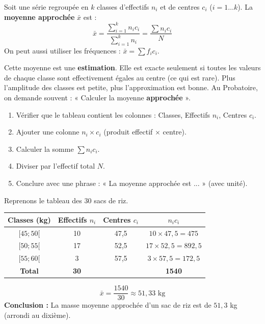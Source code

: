 \documentclass[11pt]{article}
\begin{document}
\begin{propriete}
Soit une série regroupée en $k$ classes d'effectifs $n_i$ et de centres $c_i$ ($i=1\dots k$). La \textbf{moyenne approchée} $\bar{x}$ est :
\[
\bar{x} = \frac{\sum_{i=1}^{k} n_i c_i}{\sum_{i=1}^{k} n_i} = \frac{\sum n_i c_i}{N}
\]
On peut aussi utiliser les fréquences : $\bar{x} = \sum f_i c_i$.
\end{propriete}

\begin{attention}
Cette moyenne est une \textbf{estimation}. Elle est exacte seulement si toutes les valeurs de chaque classe sont effectivement égales au centre (ce qui est rare). Plus l'amplitude des classes est petite, plus l'approximation est bonne. Au Probatoire, on demande souvent : « Calculer la moyenne \textbf{approchée} ».
\end{attention}

\begin{methode}
\begin{enumerate}
    \item Vérifier que le tableau contient les colonnes : Classes, Effectifs $n_i$, Centres $c_i$.
    \item Ajouter une colonne $n_i \times c_i$ (produit effectif $\times$ centre).
    \item Calculer la somme $\sum n_i c_i$.
    \item Diviser par l'effectif total $N$.
    \item Conclure avec une phrase : « La moyenne approchée est ... » (avec unité).
\end{enumerate}
\end{methode}

\begin{exoresolu}
Reprenons le tableau des 30 sacs de riz.
\begin{center}
\begin{tabular}{|c|c|c|c|}\hline
\textbf{Classes (kg)} & \textbf{Effectifs $n_i$} & \textbf{Centres $c_i$} & \textbf{$n_i c_i$} \\ \hline
$[45 ; 50[$ & 10 & 47,5 & $10 \times 47,5 = 475$ \\ \hline
$[50 ; 55[$ & 17 & 52,5 & $17 \times 52,5 = 892,5$ \\ \hline
$[55 ; 60[$ & 3 & 57,5 & $3 \times 57,5 = 172,5$ \\ \hline
\textbf{Total} & \textbf{30} & & \textbf{1540} \\ \hline
\end{tabular}
\end{center}
\[
\bar{x} = \frac{1540}{30} \approx 51,33 \text{ kg}
\]
\textbf{Conclusion :} La masse moyenne approchée d'un sac de riz est de $51,3$ kg (arrondi au dixième).
\end{exoresolu}
\end{document}
